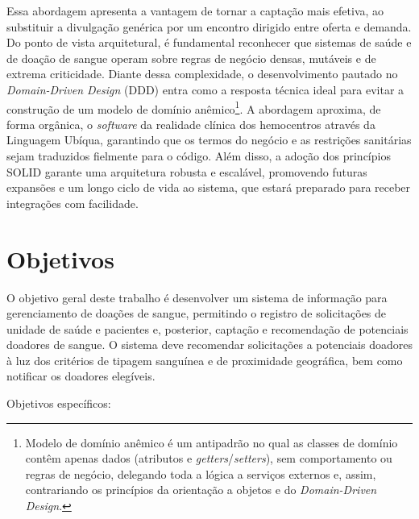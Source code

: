 Essa abordagem apresenta a vantagem de tornar a captação mais efetiva, ao substituir a divulgação genérica por um encontro dirigido entre oferta e demanda. Do ponto de vista arquitetural, é fundamental reconhecer que sistemas de saúde e de doação de sangue operam sobre regras de negócio densas, mutáveis e de extrema criticidade. Diante dessa complexidade, o desenvolvimento pautado no \textit{Domain-Driven Design} (DDD) \cite{evans2003} entra como a resposta técnica ideal para evitar a construção de um modelo de domínio anêmico\footnote{Modelo de domínio anêmico é um antipadrão no qual as classes de domínio contêm apenas dados (atributos e \textit{getters}/\textit{setters}), sem comportamento ou regras de negócio, delegando toda a lógica a serviços externos e, assim, contrariando os princípios da orientação a objetos e do \textit{Domain-Driven Design}.}. A abordagem aproxima, de forma orgânica, o \textit{software} da realidade clínica dos hemocentros através da Linguagem Ubíqua, garantindo que os termos do negócio e as restrições sanitárias sejam traduzidos fielmente para o código. Além disso, a adoção dos princípios SOLID \cite{martin2000} garante uma arquitetura robusta e escalável, promovendo futuras expansões e um longo ciclo de vida ao sistema, que estará preparado para receber integrações com facilidade.

\section{Objetivos}

O objetivo geral deste trabalho é desenvolver um sistema de informação para gerenciamento de doações de sangue, permitindo o registro de solicitações de unidade de saúde e pacientes e, posterior, captação e recomendação de potenciais doadores de sangue. O sistema deve recomendar solicitações a potenciais doadores à luz dos critérios de tipagem sanguínea e de proximidade geográfica, bem como notificar os doadores elegíveis.

Objetivos específicos:

